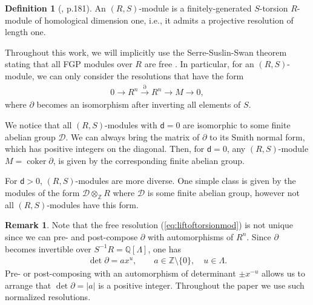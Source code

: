 \documentclass[sn-mathphys-num]{sn-jnl}
\theoremstyle{definition}
\newtheorem{definition}[lemma]{Definition}
\newtheorem{remark}[lemma]{Remark}
\numberwithin{equation}{section}
\theoremstyle{definition}
\def\CD {{\mathcal D}}
\def\CD {{\mathcal D}}
\def\pd{\partial}
\def\IQ{\mathbb{Q}}
\def\IZ{{\mathbb{Z}}}
\def\La{{\Lambda}}
\def\coker{\operatorname{coker}}
\newcommand{\dd}{{\mathsf{d}}} %
\begin{document}
\begin{definition}[\cite{Ranicki1981ExactSI}, p.181]\label{def:RSmodule}
    An $(R,S)$-module is a finitely-generated $S$-torsion $R$-module of homological dimension one, i.e., it admits a projective resolution of length one.
\end{definition}
 \vspace{3mm}
 
 Throughout this work, we will implicitly use the Serre-Suslin-Swan theorem stating that all FGP modules over $R$ are free \cite{Suslin1977,Swan1978}  . In particular,  for an $(R,S)$-module, we can only consider the resolutions that have the form 
 \begin{align}\label{eq:liftoftorsionmod}
        0\rightarrow R^n \xrightarrow{\pd} R^n\xrightarrow{} M\rightarrow 0,
    \end{align}
     where $\pd$ becomes an isomorphism after inverting all elements of $S$.
 
 
 We notice that all $(R,S)$-modules with $\dd=0$ are isomorphic to some finite abelian group $\CD$. We can always bring the matrix of $\pd$ to its Smith normal form, which has positive integers on the diagonal. Then, for $\dd=0$, any $(R,S)$-module $M=\coker \pd$, is given by the corresponding finite abelian group.

For $\dd>0$, $(R,S)$-modules are more diverse. One simple class is given by the modules of the form $\CD\otimes_\IZ R$ where $\CD$ is some finite abelian group, however not all $(R,S)$-modules have this form.
\vspace{3mm}

\begin{remark}\label{the_remark_about_det(pd)} Note that the free resolution (\ref{eq:liftoftorsionmod}) is not unique since we can pre- and post-compose $\pd$ with automorphisms of $R^n$. Since $\pd$ becomes invertible over $S^{-1}R=\IQ[\La]$, one has \begin{align} \det\pd=a x^u, \qquad a\in\IZ\setminus\{0\}, \quad u\in\La. \end{align} Pre- or post-composing with an automorphism of determinant $\pm x^{-u}$ allows us to arrange that $\det\pd=|a|$ is a positive integer. Throughout the paper we use such normalized resolutions.
\end{remark}

\vspace{3mm}
\end{document}
